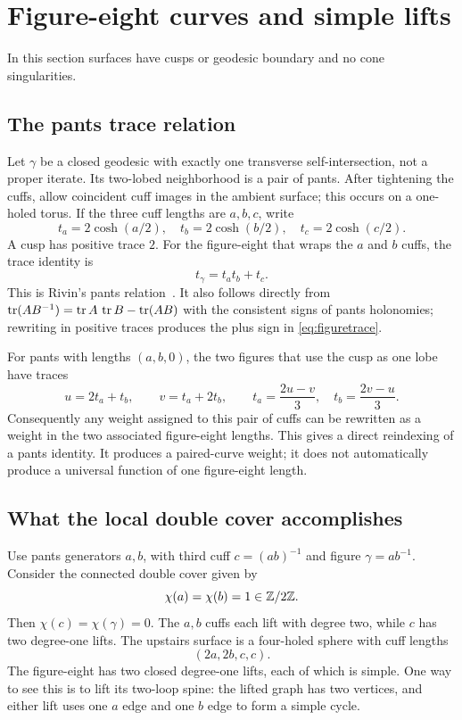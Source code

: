 \section{Figure-eight curves and simple lifts}
\label{sec:figures}

In this section surfaces have cusps or geodesic boundary and no cone
singularities.

\subsection{The pants trace relation}

Let $\gamma$ be a closed geodesic with exactly one transverse self-intersection,
not a proper iterate. Its two-lobed neighborhood is a pair of pants. After
tightening the cuffs, allow coincident cuff images in the ambient surface;
this occurs on a one-holed torus. If the three cuff lengths are $a,b,c$,
write
\[
 t_a=2\cosh(a/2),\quad t_b=2\cosh(b/2),\quad t_c=2\cosh(c/2).
\]
A cusp has positive trace $2$. For the figure-eight that wraps the $a$
and $b$ cuffs, the trace identity is
\begin{equation}
 \boxed{t_\gamma=t_at_b+t_c.}
 \label{eq:figuretrace}
\end{equation}
This is Rivin's pants relation~\cite[Theorem 1.3]{RivinFigures}. It also
follows directly from
$\operatorname{tr}(AB^{-1})=\operatorname{tr} A\,\operatorname{tr} B-\operatorname{tr}(AB)$ with the consistent signs of pants
holonomies; rewriting in positive traces produces the plus sign in
\eqref{eq:figuretrace}.

For pants with lengths $(a,b,0)$, the two figures that use the cusp as one
lobe have traces
\begin{equation}
 u=2t_a+t_b,\qquad v=t_a+2t_b,
 \qquad
 t_a=\frac{2u-v}{3},\quad t_b=\frac{2v-u}{3}.
 \label{eq:twofigures}
\end{equation}
Consequently any weight assigned to this pair of cuffs can be rewritten
as a weight in the two associated figure-eight lengths. This gives a
direct reindexing of a pants identity. It produces a paired-curve weight;
it does not automatically produce a universal function of one figure-eight
length.

\subsection{What the local double cover accomplishes}

Use pants generators $a,b$, with third cuff $c=(ab)^{-1}$ and figure
$\gamma=ab^{-1}$. Consider the connected double cover given by
\[
 \chi(a)=\chi(b)=1\in\mathbb Z/2\mathbb Z.
\]
Then $\chi(c)=\chi(\gamma)=0$. The $a,b$ cuffs each lift with degree two,
while $c$ has two degree-one lifts. The upstairs surface is a four-holed
sphere with cuff lengths
\begin{equation}
 (2a,2b,c,c).
 \label{eq:doublepants}
\end{equation}
The figure-eight has two closed degree-one lifts, each of which is simple.
One way to see this is to lift its two-loop spine: the lifted graph has
two vertices, and either lift uses one $a$ edge and one $b$ edge to form
a simple cycle.

